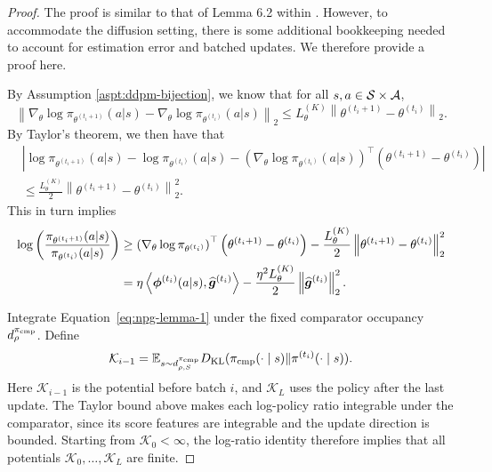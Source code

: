 \begin{proof}
    The proof is similar to that of Lemma 6.2 within \citet{agarwal2021theory}. However, to accommodate the diffusion setting, there is some additional bookkeeping needed to account for estimation error and batched updates. We therefore provide a proof here.
    
    By Assumption \ref{aspt:ddpm-bijection}, we know that for all $s, a \in {\mathcal{S}} \times {\mathcal{A}}$,
    \begin{equation}\left\lVert\nabla_\theta \log \pi_{\theta^{(t_i+1)}}(a|s) - \nabla_\theta \log \pi_{\theta^{(t_i)}}(a|s) \right\rVert_2 \leq L^{(K)}_\theta\left\lVert \theta^{(t_i+1)} - \theta^{(t_i)}\right\rVert_2.
    \end{equation}
    By Taylor's theorem, we then have that
    \begin{align}
        &\left| \log \pi_{\theta^{(t_i+1)}}(a|s) - \log \pi_{\theta^{(t_i)}}(a|s) - \left(\nabla_\theta \log \pi_{\theta^{(t_i)}}(a|s) \right)^\top \left(\theta^{(t_i+1)} - \theta^{(t_i)}\right) \right| \\
        &\leq \frac{L^{(K)}_\theta}{2} \left\lVert \theta^{(t_i+1)} - \theta^{(t_i)}\right\rVert_2^2.
    \end{align}
    This in turn implies
    \begin{align}
        \log\left(\frac{\pi_{\theta^{(t_i+1)}}(a|s)}{\pi_{\theta^{(t_i)}}(a|s)}\right) 
        &\geq \left(\nabla_\theta \log \pi_{\theta^{(t_i)}}\right)^\top \left(\theta^{(t_i+1)} - \theta^{(t_i)}\right) - \frac{L^{(K)}_\theta}{2} \left\lVert \theta^{(t_i+1)} - \theta^{(t_i)}\right\rVert_2^2 \\
        &= \eta \left\langle \boldsymbol{\phi}^{(t_i)}(a|s), \widehat{\bm{g}}^{(t_i)} \right\rangle - \frac{\eta^2 L^{(K)}_\theta}{2} \left\lVert  \widehat{\bm{g}}^{(t_i)} \right\rVert_2^2.
        \label{eq:npg-lemma-1}
    \end{align}

    Integrate Equation~\ref{eq:npg-lemma-1} under the fixed comparator
occupancy $d_\rho^{\pi_{\rm cmp}}$. Define
\[
\mathcal K_{i-1}=\mathbb{E}_{s\sim d_{\rho,S}^{\pi_{\rm cmp}}}
D_{\mathrm{KL}}(\pi_{\rm cmp}(\cdot\mid s)\|\pi^{(t_i)}(\cdot\mid s)).
\]
Here $\mathcal K_{i-1}$ is the potential before batch $i$, and $\mathcal K_L$ uses the policy after the last update. The Taylor bound above
makes each log-policy ratio integrable under the comparator, since its score
features are integrable and the update direction is bounded. Starting from
$\mathcal K_0<\infty$, the log-ratio identity therefore implies that all potentials $\mathcal K_0,\ldots,\mathcal K_L$ are finite.


\end{proof}
